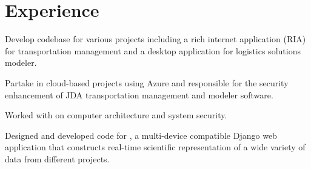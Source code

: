 \documentclass[]{deedy_format_Hien}
\begin{document}
\begin{minipage}[t]{0.66\textwidth} 
%
%


\section{Experience}
\vspace{5mm}
\justify
\begin{tightemize}
\item Develop codebase for various projects including a rich internet application (RIA) for transportation management and a desktop application for logistics solutions modeler.  
\item Partake in cloud-based projects using Azure and responsible for the security enhancement of JDA transportation management and modeler software.  
\end{tightemize}
\vspace{\topsep}
\sectionsep

\vspace{1mm}
\justify
\begin{tightemize}
\item Worked with  on computer architecture and system security.
\end{tightemize}
\vspace{\topsep}
\sectionsep

\vspace{1mm}
\justify
\begin{tightemize}
\item Designed and developed  code for , a multi-device compatible Django web application that constructs real-time scientific representation of a wide variety of data from different projects.
\end{tightemize}
\vspace{\topsep}
\sectionsep


\end{minipage}
\end{document}
